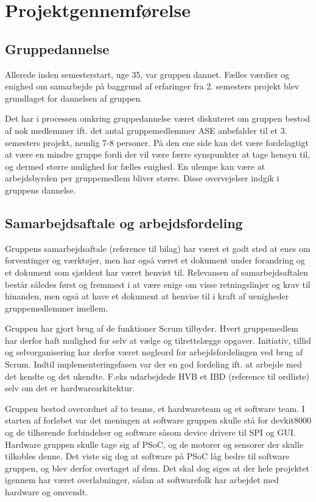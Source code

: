 \chapter*{Projektgennemførelse}
\section*{Gruppedannelse}
Allerede inden semesterstart, uge 35, var gruppen dannet. Fælles værdier og enighed om samarbejde på baggrund af erfaringer fra 2. semesters projekt blev grundlaget for dannelsen af gruppen.

Det har i processen omkring gruppedannelse været diskuteret om gruppen bestod af nok medlemmer ift. det antal gruppemedlemmer ASE anbefalder til et 3. semesters projekt, nemlig 7-8 personer. På den ene side kan det være fordelagtigt at være en mindre gruppe fordi der vil være færre synspunkter at tage hensyn til, og dermed større mulighed for fælles enighed. En ulempe kan være at arbejdsbyrden per gruppemedlem bliver større. Disse overvejelser indgik i gruppens dannelse.\\

\section*{Samarbejdsaftale og arbejdsfordeling}
Gruppens samarbejdsaftale (reference til bilag) har været et godt sted at enes om forventinger og værktøjer, men har også været et dokument under forandring og et dokument som sjældent har været henvist til. 
Relevansen af samarbejdsaftalen består således først og fremmest i at være enige om visse retningslinjer og krav til hinanden, men også at have et dokument at henvise til i kraft af uenigheder gruppemedlemmer imellem.

Gruppen har gjort brug af de funktioner Scrum tilbyder. Hvert gruppemedlem har derfor haft mulighed for selv at vælge og tilrettelægge opgaver. Initiativ, tillid og selvorganisering har derfor været nøgleord for arbejdsfordelingen ved brug af Scrum.
Indtil implementeringsfasen var der en god fordeling ift. at arbejde med det kendte og det ukendte. F.eks udarbejdede HVB et IBD (reference til ordliste) selv om det er hardwarearkitektur.

Gruppen bestod overordnet af to teams, et hardwareteam og et software team. I starten af forløbet var det meningen at software gruppen skulle stå for devkit8000 og de tilhørende forbindelser og software såsom device drivere til SPI og GUI. 
Hardware gruppen skulle tage sig af PSoC, og de motorer og sensorer der skulle tilkobles denne. Det viste sig dog at software på PSoC låg bedre til software gruppen, og blev derfor overtaget af dem. Det skal dog siges at der hele projektet igennem har været overlabninger, sådan at softwarefolk har arbejdet med hardware og omvendt.

